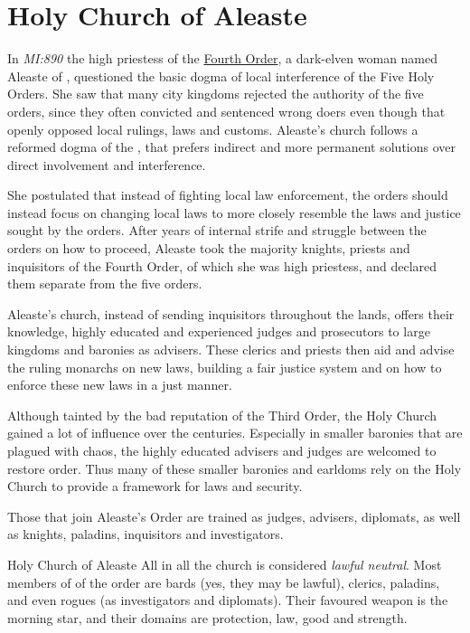 \section{Holy Church of Aleaste}
\label{sec:Holy Church of Aleaste}

In \emph{MI:890} the high priestess of the
\hyperref[sec:Five Holy Orders]{Fourth Order}, a dark-elven woman named
Aleaste of , questioned the basic dogma of local
interference of the Five Holy Orders. She saw that many city kingdoms rejected
the authority of the five orders, since they often convicted and sentenced
wrong doers even though that openly opposed local rulings, laws and customs.
Aleaste's church follows a reformed dogma of the , that
prefers indirect and more permanent solutions over direct involvement and
interference.

She postulated that instead of fighting local law enforcement, the orders
should instead focus on changing local laws to more closely resemble the laws
and justice sought by the orders. After years of internal strife and struggle
between the orders on how to proceed, Aleaste took the majority knights, priests
and inquisitors of the Fourth Order, of which she was high priestess, and
declared them separate from the five orders.

Aleaste's church, instead of sending inquisitors throughout the lands, offers
their knowledge, highly educated and experienced judges and prosecutors to
large kingdoms and baronies as advisers. These clerics and priests then aid
and advise the ruling monarchs on new laws, building a fair justice system and
on how to enforce these new laws in a just manner.

Although tainted by the bad reputation of the Third Order, the Holy Church
gained a lot of influence over the centuries. Especially in smaller baronies
that are plagued with chaos, the highly educated advisers and judges are
welcomed to restore order. Thus many of these smaller baronies and earldoms
rely on the Holy Church to provide a framework for laws and security.

Those that join Aleaste's Order are trained as judges, advisers, diplomats, as
well as knights, paladins, inquisitors and investigators.

\begin{35e}{Holy Church of Aleaste}
  All in all the church is considered \emph{lawful neutral}. Most members of
  of the order are bards (yes, they may be lawful), clerics, paladins, and even
  rogues (as investigators and diplomats). Their favoured weapon is the morning
  star, and their domains are protection, law, good and strength.
\end{35e}
